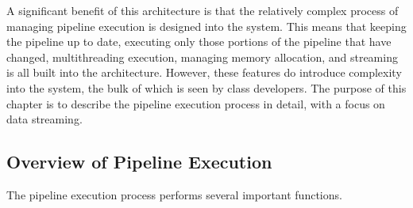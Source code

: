 A significant benefit of this architecture is that the relatively complex
process of managing pipeline execution is designed into the system. This
means that keeping the pipeline up to date, executing only those portions of
the pipeline that have changed, multithreading execution, managing memory
allocation, and streaming is all built into the architecture. However, these
features do introduce complexity into the system, the bulk of which is seen
by class developers. The purpose of this chapter is to describe the pipeline
execution process in detail, with a focus on data streaming.


\subsection{Overview of Pipeline Execution}
\label{sec:OverviewPipelineExecution}

The pipeline execution process performs several important functions.

\begin{figure}
  \par\centering
  \label{fig:DataPipeLine}
  \par
\end{figure}

